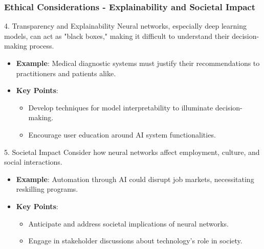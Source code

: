 \documentclass[aspectratio=169]{beamer}
\begin{document}
\begin{frame}[fragile]
    \frametitle{Ethical Considerations - Explainability and Societal Impact}
    \begin{block}{4. Transparency and Explainability}
        Neural networks, especially deep learning models, can act as "black boxes," making it difficult to understand their decision-making process.
    \end{block}
    \begin{itemize}
        \item \textbf{Example}: Medical diagnostic systems must justify their recommendations to practitioners and patients alike.
        \item \textbf{Key Points}:
        \begin{itemize}
            \item Develop techniques for model interpretability to illuminate decision-making.
            \item Encourage user education around AI system functionalities.
        \end{itemize}
    \end{itemize}
    
    \begin{block}{5. Societal Impact}
        Consider how neural networks affect employment, culture, and social interactions.
    \end{block}
    \begin{itemize}
        \item \textbf{Example}: Automation through AI could disrupt job markets, necessitating reskilling programs.
        \item \textbf{Key Points}:
        \begin{itemize}
            \item Anticipate and address societal implications of neural networks.
            \item Engage in stakeholder discussions about technology's role in society.
        \end{itemize}
    \end{itemize}
\end{frame}
\end{document}
